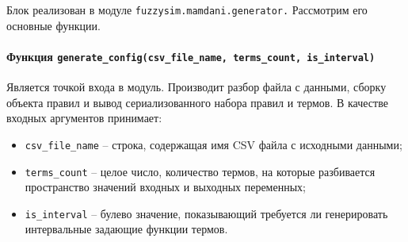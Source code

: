 Блок реализован в модуле  \lstinline!fuzzysim.mamdani.generator.! Рассмотрим его основные функции.

\paragraph{Функция \lstinline!generate_config(csv_file_name, terms_count, is_interval)!}

Является точкой входа в модуль. Производит разбор файла с данными, сборку объекта правил и вывод сериализованного набора правил и термов. В качестве входных аргументов принимает:

\begin{itemize}
	\item \lstinline!csv_file_name! – строка, содержащая имя CSV файла с исходными данными;
	\item \lstinline!terms_count! – целое число, количество термов, на которые разбивается пространство значений входных и выходных переменных;
	\item \lstinline!is_interval! – булево значение, показывающий требуется ли генерировать интервальные задающие функции термов.
\end{itemize}

